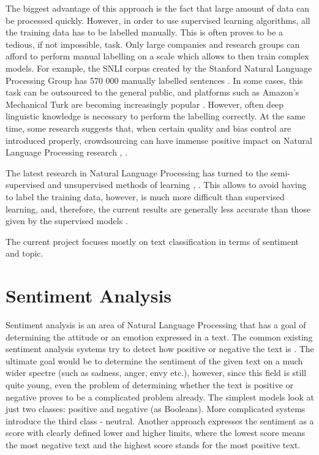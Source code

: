 The biggest advantage of this approach is the fact that large amount of data can be processed quickly. However, in order to use supervised learning algorithms, all the training data has to be labelled manually. This is often proves to be a tedious, if not impossible, task. Only large companies and research groups can afford to perform manual labelling on a scale which allows to then train complex models. For example, the SNLI corpus created by the Stanford Natural Language Processing Group has 570 000 manually labelled sentences \cite{ferrero2017compilig}. In some cases, this task can be outsourced to the general public, and platforms such as Amazon's Mechanical Turk are becoming increasingly popular \cite{callison2010creating}. However, often deep linguistic knowledge is necessary to perform the labelling correctly. At the same time, some research suggests that, when certain quality and bias control are introduced properly, crowdsourcing can have immense positive impact on Natural Language Processing research \cite{sabou2012crowdsourcing}, \cite{snow2008cheap}.

The latest research in Natural Language Processing has turned to the semi-supervised and unsupervised methods of learning \cite{liang2005semi}, \cite{turian2010word}. This allows to avoid having to label the training data, however, is much more difficult than supervised learning, and, therefore, the current results are generally less accurate than those given by the supervised models \cite{lapata2005web}.

The current project focuses mostly on text classification in terms of sentiment and topic. 

\section{Sentiment Analysis}
\label{sec:sentiment_analysis}

Sentiment analysis is an area of Natural Language Processing that has a goal of determining the attitude or an emotion expressed in a text. The common existing sentiment analysis systems try to detect how positive or negative the text is \cite{yi2003sentiment}. The ultimate goal would be to determine the sentiment of the given text on a much wider spectre (such as sadness, anger, envy etc.), however, since this field is still quite young, even the problem of determining whether the text is positive or negative proves to be a complicated problem already. The simplest models look at just two classes: positive and negative (as Booleans). More complicated systems introduce the third class - neutral. Another approach expresses the sentiment as a score with clearly defined lower and higher limits, where the lowest score means the most negative text and the highest score stands for the most positive text.

